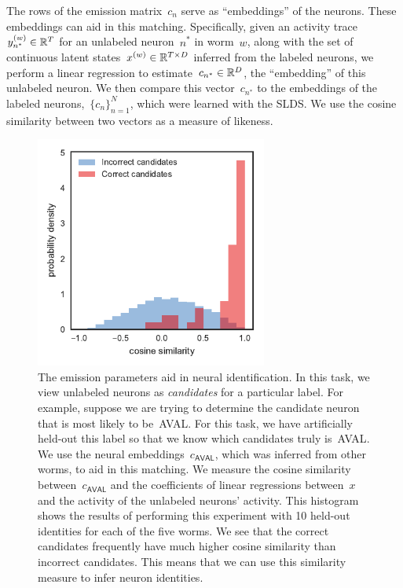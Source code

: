 \documentclass{article}
\begin{document}
The rows of the emission matrix~$c_n$ serve as ``embeddings'' of the
neurons. These embeddings can aid in this matching.  Specifically,
given an activity trace~$y^{(w)}_{n^*} \in \mathbb{R}^T$ for an unlabeled
neuron~$n^*$ in worm~$w$, along with the set of continuous latent
states~$x^{(w)} \in \mathbb{R}^{T \times D}$ inferred from the labeled
neurons, we perform a linear regression to
estimate~$c_{n^*} \in \mathbb{R}^D$, the ``embedding'' of this unlabeled
neuron.  We then compare this vector~$c_{n^*}$ to the embeddings of
the labeled neurons,~$\{c_n\}_{n=1}^N$, which were learned with the
SLDS.  We use the cosine similarity between two vectors as a measure
of likeness.


\begin{figure}[h]
\centering%
\includegraphics[width=3in]{figures/lds/similarity_comparison} 
\caption{The emission parameters aid in neural identification.  In
  this task, we view unlabeled neurons as \emph{candidates} for a
  particular label. For example, suppose we are trying to determine
  the candidate neuron that is most likely to be~\textsf{AVAL}. For
  this task, we have artificially held-out this label so that we know
  which candidates truly is~\textsf{AVAL}. We use the neural
  embeddings~$c_{\mathsf{AVAL}}$, which was inferred from other worms,
  to aid in this matching.  We measure the cosine similarity
  between~$c_{\mathsf{AVAL}}$ and the coefficients of linear
  regressions between~$x$ and the activity of the unlabeled neurons'
  activity. This histogram shows the results of performing this
  experiment with 10 held-out identities for each of the five worms.
  We see that the correct candidates frequently have much higher
  cosine similarity than incorrect candidates.  This means that we can
  use this similarity measure to infer neuron identities.  }
\label{fig:neuron_id}
\end{figure}
\end{document}
